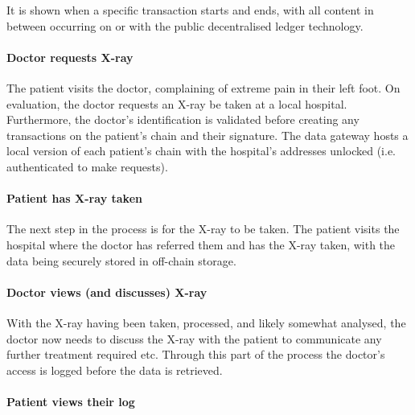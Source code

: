 It is shown when a specific transaction starts and ends, with all content in between occurring on or with the public decentralised ledger technology.

\paragraph{Doctor requests X-ray}

The patient visits the doctor, complaining of extreme pain in their left foot. On evaluation, the doctor requests an X-ray be taken at a local hospital. Furthermore, the doctor's identification is validated before creating any transactions on the patient's chain and their signature. The data gateway hosts a local version of each patient's chain with the hospital's addresses unlocked (i.e. authenticated to make requests).





\paragraph{Patient has X-ray taken}

The next step in the process is for the X-ray to be taken. The patient visits the hospital where the doctor has referred them and has the X-ray taken, with the data being securely stored in off-chain storage.



\paragraph{Doctor views (and discusses) X-ray}

With the X-ray having been taken, processed, and likely somewhat analysed, the doctor now needs to discuss the X-ray with the patient to communicate any further treatment required etc. Through this part of the process the doctor's access is logged before the data is retrieved.



\paragraph{Patient views their log}




